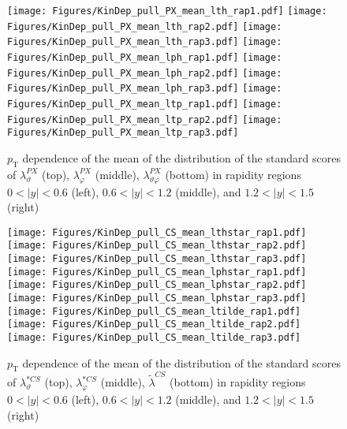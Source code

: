 \documentclass[12pt]{article}
\newcommand{\pT}{p_\mathrm{T}}
\newcommand{\absy}{\left |  y \right |}
\newcommand{\lamtildeCS}{\tilde{\lambda}^{\scriptscriptstyle CS}}
\newcommand{\lamthstarCS}{\lambda^{* \scriptscriptstyle CS}_\vartheta}
\newcommand{\lamphstarCS}{\lambda^{* \scriptscriptstyle CS}_\varphi}
\newcommand{\lamthPX}{\lambda^{\scriptscriptstyle PX}_\vartheta}
\newcommand{\lamphPX}{\lambda^{\scriptscriptstyle PX}_\varphi}
\newcommand{\lamthphPX}{\lambda^{\scriptscriptstyle PX}_{\vartheta \varphi}}
\begin{document}
\begin{figure}[htbp]
\centering
\texttt{[image: Figures/KinDep\_pull\_PX\_mean\_lth\_rap1.pdf]}
\texttt{[image: Figures/KinDep\_pull\_PX\_mean\_lth\_rap2.pdf]}
\texttt{[image: Figures/KinDep\_pull\_PX\_mean\_lth\_rap3.pdf]}
\texttt{[image: Figures/KinDep\_pull\_PX\_mean\_lph\_rap1.pdf]}
\texttt{[image: Figures/KinDep\_pull\_PX\_mean\_lph\_rap2.pdf]}
\texttt{[image: Figures/KinDep\_pull\_PX\_mean\_lph\_rap3.pdf]}
\texttt{[image: Figures/KinDep\_pull\_PX\_mean\_ltp\_rap1.pdf]}
\texttt{[image: Figures/KinDep\_pull\_PX\_mean\_ltp\_rap2.pdf]}
\texttt{[image: Figures/KinDep\_pull\_PX\_mean\_ltp\_rap3.pdf]}
\caption{$\pT$ dependence of the mean of the distribution of the standard scores
of $\lamthPX$ (top), $\lamphPX$ (middle), $\lamthphPX$ (bottom) in rapidity
regions $0<\absy<0.6$ (left), $0.6<\absy<1.2$ (middle), and $1.2<\absy<1.5$ (right)}
\end{figure}
\clearpage


\begin{figure}[htbp]
\centering
\texttt{[image: Figures/KinDep\_pull\_CS\_mean\_lthstar\_rap1.pdf]}
\texttt{[image: Figures/KinDep\_pull\_CS\_mean\_lthstar\_rap2.pdf]}
\texttt{[image: Figures/KinDep\_pull\_CS\_mean\_lthstar\_rap3.pdf]}
\texttt{[image: Figures/KinDep\_pull\_CS\_mean\_lphstar\_rap1.pdf]}
\texttt{[image: Figures/KinDep\_pull\_CS\_mean\_lphstar\_rap2.pdf]}
\texttt{[image: Figures/KinDep\_pull\_CS\_mean\_lphstar\_rap3.pdf]}
\texttt{[image: Figures/KinDep\_pull\_CS\_mean\_ltilde\_rap1.pdf]}
\texttt{[image: Figures/KinDep\_pull\_CS\_mean\_ltilde\_rap2.pdf]}
\texttt{[image: Figures/KinDep\_pull\_CS\_mean\_ltilde\_rap3.pdf]}
\caption{$\pT$ dependence of the mean of the distribution of the standard scores
of $\lamthstarCS$ (top), $\lamphstarCS$ (middle), $\lamtildeCS$ (bottom) in rapidity
regions $0<\absy<0.6$ (left), $0.6<\absy<1.2$ (middle), and $1.2<\absy<1.5$ (right)}
\end{figure}
\clearpage
\end{document}
